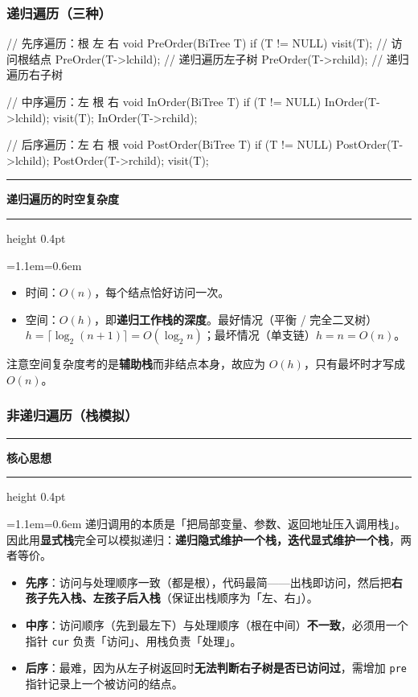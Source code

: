 \documentclass[11pt,openany,UTF8]{ctexbook}
\newcommand{\callouthead}[2]{%
  \par\addvspace{7pt}\noindent
  {\color{#1}\rule[-0.15em]{3pt}{1.05em}}\hspace{0.5em}%
  {\bfseries\color{#1}#2}\par\nobreak\vspace{-0.35em}%
  {\color{rulesep}\hrule height 0.4pt}\nobreak\vspace{0.45em}%
  \begingroup\small\setlength{\parindent}{0pt}%
  \leftskip=1.1em\rightskip=0.6em\noindent\ignorespaces}
\newcommand{\calloutend}{\par\endgroup\addvspace{7pt}}
\newenvironment{callkey}[1]{\callouthead{keybar}{#1}}{\calloutend}
\begin{document}
\subsubsection{递归遍历（三种）}

\begin{codebox}
// 先序遍历：根 左 右
void PreOrder(BiTree T) {
    if (T != NULL) {
        visit(T);            // 访问根结点
        PreOrder(T->lchild); // 递归遍历左子树
        PreOrder(T->rchild); // 递归遍历右子树
    }
}

// 中序遍历：左 根 右
void InOrder(BiTree T) {
    if (T != NULL) {
        InOrder(T->lchild);
        visit(T);
        InOrder(T->rchild);
    }
}

// 后序遍历：左 右 根
void PostOrder(BiTree T) {
    if (T != NULL) {
        PostOrder(T->lchild);
        PostOrder(T->rchild);
        visit(T);
    }
}
\end{codebox}

\begin{callkey}{递归遍历的时空复杂度}
\begin{itemize}
\item 时间：$O(n)$，每个结点恰好访问一次。
\item 空间：$O(h)$，即\textbf{递归工作栈的深度}。最好情况（平衡 / 完全二叉树）$h=\lceil\log_2(n+1)\rceil=O(\log_2 n)$；最坏情况（单支链）$h=n=O(n)$。
\end{itemize}
注意空间复杂度考的是\textbf{辅助栈}而非结点本身，故应为 $O(h)$，只有最坏时才写成 $O(n)$。

\end{callkey}

\subsubsection{非递归遍历（栈模拟）}

\begin{callkey}{核心思想}
递归调用的本质是「把局部变量、参数、返回地址压入调用栈」。因此用\textbf{显式栈}完全可以模拟递归：\textbf{递归隐式维护一个栈，迭代显式维护一个栈}，两者等价。

\begin{itemize}
\item \textbf{先序}：访问与处理顺序一致（都是根），代码最简——出栈即访问，然后把\textbf{右孩子先入栈、左孩子后入栈}（保证出栈顺序为「左、右」）。
\item \textbf{中序}：访问顺序（先到最左下）与处理顺序（根在中间）\textbf{不一致}，必须用一个指针 \texttt{cur} 负责「访问」、用栈负责「处理」。
\item \textbf{后序}：最难，因为从左子树返回时\textbf{无法判断右子树是否已访问过}，需增加 \texttt{pre} 指针记录上一个被访问的结点。
\end{itemize}
\end{callkey}
\end{document}
